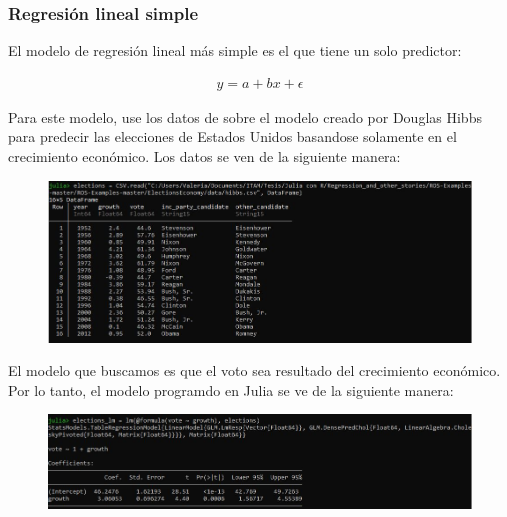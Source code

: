 
\subsubsection{Regresión lineal simple}
El modelo de regresión lineal más simple es el que tiene un solo predictor: 

\begin{equation}
    \begin{aligned}
    y = a + bx + \epsilon
    \end{aligned}
\end{equation}

Para este modelo, use los datos de \citep{regression_other_stories} sobre el modelo creado por Douglas Hibbs para predecir las elecciones de Estados Unidos basandose solamente en el crecimiento económico. Los datos se ven de la siguiente manera: 

\begin{figure}[H]
\begin{center}
\includegraphics[scale=0.5]{Imagenes/elections_dataframe.JPG}
  \label{elections_dataframe}
\end{center}
\end{figure}

El modelo que buscamos es que el voto sea resultado del crecimiento económico. Por lo tanto, el modelo programdo en Julia se ve de la siguiente manera:

\begin{figure}[h]
\begin{center}
\includegraphics[scale=0.5]{Imagenes/elections_modelo.JPG}
  \label{elections_modelo}
\end{center}
\end{figure}

